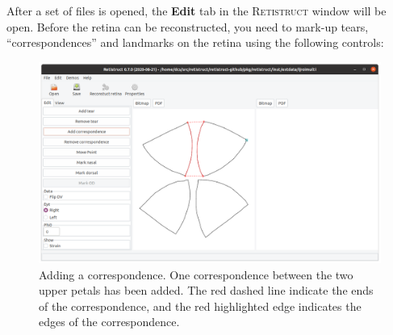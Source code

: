 \documentclass{book}
\begin{document}
After a set of files is opened, the \textbf{Edit} tab in the
\textsc{Retistruct} window will be open. Before the retina can be
reconstructed, you need to mark-up tears, ``correspondences'' and
landmarks on the retina using the following controls:

\begin{figure}
  \includegraphics[width=\linewidth]{correspondence}
  \caption{Adding a correspondence. One correspondence between the two
    upper petals has been added. The red dashed line indicate the ends
    of the correspondence, and the red highlighted edge indicates the
    edges of the correspondence.}
  \label{retistruct-user-guide:fig:correspondence}
\end{figure}
\end{document}

